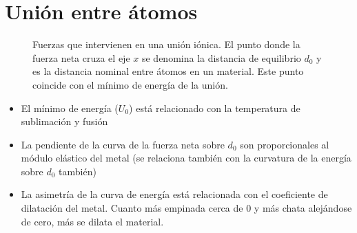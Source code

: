 \section{Unión entre átomos}

\begin{figure}
    \centering

\caption{Fuerzas que intervienen en una unión iónica. El punto donde la fuerza neta cruza el eje $x$ se denomina la distancia de equilibrio $d_0$ y es la distancia nominal entre átomos en un material. Este punto coincide con el mínimo de energía de la unión.}

\label{fig:curvas_condonmorse}

\end{figure}

\begin{itemize}
    \item El mínimo de energía ($U_0$) está relacionado con la temperatura de sublimación y fusión
    \item La pendiente de la curva de la fuerza neta sobre $d_0$ son proporcionales al módulo elástico del metal (se relaciona también con la curvatura de la energía sobre $d_0$ también)
    \item La asimetría de la curva de energía está relacionada con el coeficiente de dilatación del metal. Cuanto más empinada cerca de 0 y más chata alejándose de cero, más se dilata el material.
\end{itemize}




